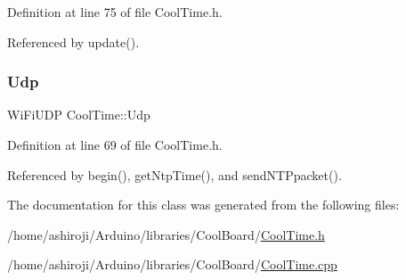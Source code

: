 Definition at line 75 of file Cool\+Time.\+h.



Referenced by update().

\mbox{\label{classCoolTime_a4e23216a8121ca79d0fb019f30884b92}} 
\subsubsection{\texorpdfstring{Udp}{Udp}}
{\footnotesize\ttfamily Wi\+Fi\+U\+DP Cool\+Time\+::\+Udp\hspace{0.3cm}{\ttfamily [private]}}



Definition at line 69 of file Cool\+Time.\+h.



Referenced by begin(), get\+Ntp\+Time(), and send\+N\+T\+Ppacket().



The documentation for this class was generated from the following files\+:\begin{DoxyCompactItemize}
\item 
/home/ashiroji/\+Arduino/libraries/\+Cool\+Board/\hyperlink{CoolTime_8h}{Cool\+Time.\+h}\item 
/home/ashiroji/\+Arduino/libraries/\+Cool\+Board/\hyperlink{CoolTime_8cpp}{Cool\+Time.\+cpp}\end{DoxyCompactItemize}
